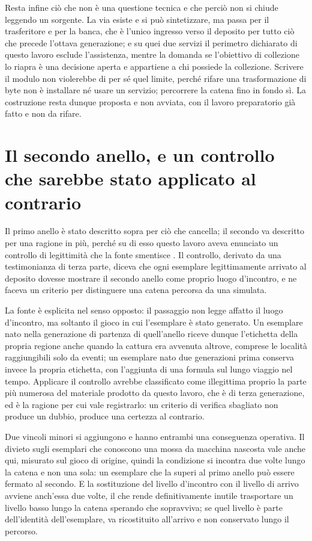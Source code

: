 Resta infine ciò che non è una questione tecnica e che perciò non si chiude leggendo un sorgente. La via esiste e si può sintetizzare, ma passa per il trasferitore e per la banca, che è l'unico ingresso verso il deposito per tutto ciò che precede l'ottava generazione; e su quei due servizi il perimetro dichiarato di questo lavoro esclude l'assistenza, mentre la domanda se l'obiettivo di collezione lo riapra è una decisione aperta e appartiene a chi possiede la collezione. Scrivere il modulo non violerebbe di per sé quel limite, perché rifare una trasformazione di byte non è installare né usare un servizio; percorrere la catena fino in fondo sì. La costruzione resta dunque proposta e non avviata, con il lavoro preparatorio già fatto e non da rifare.

\section{Il secondo anello, e un controllo che sarebbe stato applicato al contrario}

Il primo anello è stato descritto sopra per ciò che cancella; il secondo va descritto per una ragione in più, perché su di esso questo lavoro aveva enunciato un controllo di legittimità che la fonte smentisce \cite{bulbapedia-poke-transfer}. Il controllo, derivato da una testimonianza di terza parte, diceva che ogni esemplare legittimamente arrivato al deposito dovesse mostrare il secondo anello come proprio luogo d'incontro, e ne faceva un criterio per distinguere una catena percorsa da una simulata.

La fonte è esplicita nel senso opposto: il passaggio non legge affatto il luogo d'incontro, ma soltanto il gioco in cui l'esemplare è stato generato. Un esemplare nato nella generazione di partenza di quell'anello riceve dunque l'etichetta della propria regione anche quando la cattura era avvenuta altrove, comprese le località raggiungibili solo da eventi; un esemplare nato due generazioni prima conserva invece la propria etichetta, con l'aggiunta di una formula sul lungo viaggio nel tempo. Applicare il controllo avrebbe classificato come illegittima proprio la parte più numerosa del materiale prodotto da questo lavoro, che è di terza generazione, ed è la ragione per cui vale registrarlo: un criterio di verifica sbagliato non produce un dubbio, produce una certezza al contrario.

Due vincoli minori si aggiungono e hanno entrambi una conseguenza operativa. Il divieto sugli esemplari che conoscono una mossa da macchina nascosta vale anche qui, misurato sul gioco di origine, quindi la condizione si incontra due volte lungo la catena e non una sola: un esemplare che la superi al primo anello può essere fermato al secondo. E la sostituzione del livello d'incontro con il livello di arrivo avviene anch'essa due volte, il che rende definitivamente inutile trasportare un livello basso lungo la catena sperando che sopravviva; se quel livello è parte dell'identità dell'esemplare, va ricostituito all'arrivo e non conservato lungo il percorso.

